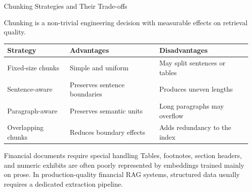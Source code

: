 \documentclass[11pt,aspectratio=169,professionalfonts]{beamer}
\begin{document}
\begin{frame}{Chunking Strategies and Their Trade-offs}

  Chunking is a non-trivial engineering decision with measurable
  effects on retrieval quality.
  \medskip

  \begin{center}
  \scriptsize
  \renewcommand{\arraystretch}{1.3}
  \setlength{\tabcolsep}{4pt}

  \begin{tabular}{@{}lll@{}}
    \toprule
    \textbf{Strategy}
      & \textbf{Advantages}
      & \textbf{Disadvantages} \\
    \midrule

    Fixed-size chunks
      & Simple and uniform
      & May split sentences or tables \\

    Sentence-aware
      & Preserves sentence boundaries
      & Produces uneven lengths \\

    Paragraph-aware
      & Preserves semantic units
      & Long paragraphs may overflow \\

    Overlapping chunks
      & Reduces boundary effects
      & Adds redundancy to the index \\

    \bottomrule
  \end{tabular}

  \end{center}

  \medskip

  \begin{alertblock}{Financial documents require special handling}
    Tables, footnotes, section headers, and numeric exhibits are often
    poorly represented by embeddings trained mainly on prose.
    In production-quality financial RAG systems, structured data usually
    requires a dedicated extraction pipeline.
  \end{alertblock}

\end{frame}
%
%
\end{document}
